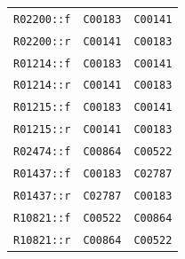 \documentclass[10pt]{article}
\begin{document}
\begin{longtable}{>{\raggedright\arraybackslash}p{.26\linewidth}>{\raggedright\arraybackslash}p{.30\linewidth}>{\raggedright\arraybackslash}p{.32\linewidth}}
\texttt{R02200::f} & \texttt{C00183} & \texttt{C00141}\\
\texttt{R02200::r} & \texttt{C00141} & \texttt{C00183}\\
\texttt{R01214::f} & \texttt{C00183} & \texttt{C00141}\\
\texttt{R01214::r} & \texttt{C00141} & \texttt{C00183}\\
\texttt{R01215::f} & \texttt{C00183} & \texttt{C00141}\\
\texttt{R01215::r} & \texttt{C00141} & \texttt{C00183}\\
\texttt{R02474::f} & \texttt{C00864} & \texttt{C00522}\\
\texttt{R01437::f} & \texttt{C00183} & \texttt{C02787}\\
\texttt{R01437::r} & \texttt{C02787} & \texttt{C00183}\\
\texttt{R10821::f} & \texttt{C00522} & \texttt{C00864}\\
\texttt{R10821::r} & \texttt{C00864} & \texttt{C00522}\\
\bottomrule\end{longtable}
\end{document}
